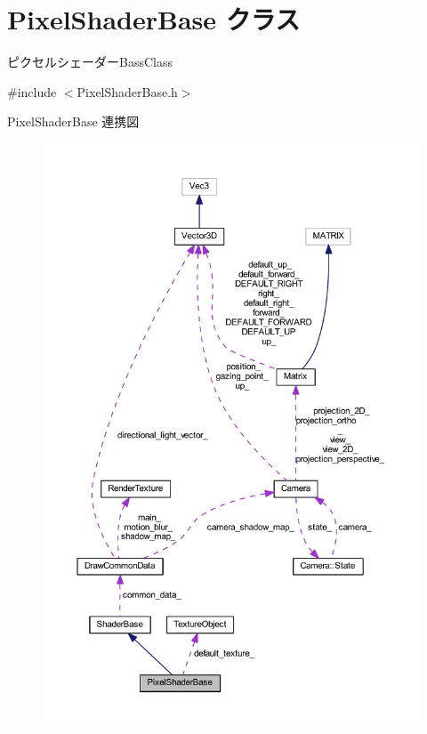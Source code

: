 \hypertarget{class_pixel_shader_base}{}\section{Pixel\+Shader\+Base クラス}
\label{class_pixel_shader_base}


ピクセルシェーダー\+Bass\+Class  




{\ttfamily \#include $<$Pixel\+Shader\+Base.\+h$>$}



Pixel\+Shader\+Base 連携図\nopagebreak
\begin{figure}[H]
\begin{center}
\leavevmode
\includegraphics[width=350pt]{class_pixel_shader_base__coll__graph}
\end{center}
\end{figure}
